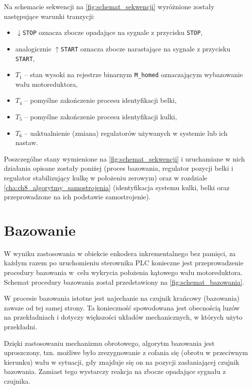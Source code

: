 Na schemacie sekwencji na \cref{fig:schemat_sekwencji} wyróżnione zostały następujące warunki tranzycji:
\begin{itemize}
    \item $\downarrow$\texttt{STOP} oznacza zbocze opadające na sygnale z przycisku \texttt{STOP},
    \item analogicznie $\uparrow$\texttt{START} oznacza zbocze narastające na sygnale z przycisku \texttt{START},
    \item $T_1$ -- stan wysoki na rejestrze binarnym \texttt{M\_homed} oznaczającym wybazowanie wału motoreduktora,
    \item $T_4$ -- pomyślne zakończenie procesu identyfikacji belki,
    \item $T_5$ -- pomyślne zakończenie procesu identyfikacji kulki,
    \item $T_6$ -- uaktualnienie (zmiana) regulatorów używanych w systemie lub ich nastaw.
\end{itemize}

Poszczególne stany wymienione na \cref{fig:schemat_sekwencji} i uruchamiane w nich działania opisane zostały poniżej (proces bazowania, regulator pozycji belki i regulator stabilizujący kulkę w położeniu zerowym) oraz w rozdziale \ref{cha:ch8_algorytmy_samostrojenia} (identyfikacja systemu kulki, belki oraz przeprowadzone na ich podstawie samostrojenie).

\section{Bazowanie}
\label{sec:ch7_bazowanie}

W wyniku zastosowania w obiekcie enkodera inkrementalnego bez pamięci, za każdym razem po uruchomieniu sterownika PLC konieczne jest przeprowadzenie procedury bazowania w~celu wykrycia położenia kątowego wału motoreduktora. Schemat procedury bazowania został przedstawiony na \cref{fig:schemat_bazowania}.

W procesie bazowania istotne jest najechanie na czujnik krańcowy (bazowania) zawsze od tej samej strony. Ta konieczność spowodowana jest obecnością luzów na przekładniach i dotyczy większości układów mechanicznych, w których użyto przekładni.

Dzięki zastosowaniu mechanizmu obrotowego, algorytm bazowania jest uproszczony, tzn. możliwe było zrezygnowanie z cofania się (obrotu w przeciwnym kierunku) wału w sytuacji, gdy znajduje się on na pozycji zasłaniającej czujnik bazowania. Zamiast tego wystarczy reakcja na zbocze opadające sygnału z czujnika.

